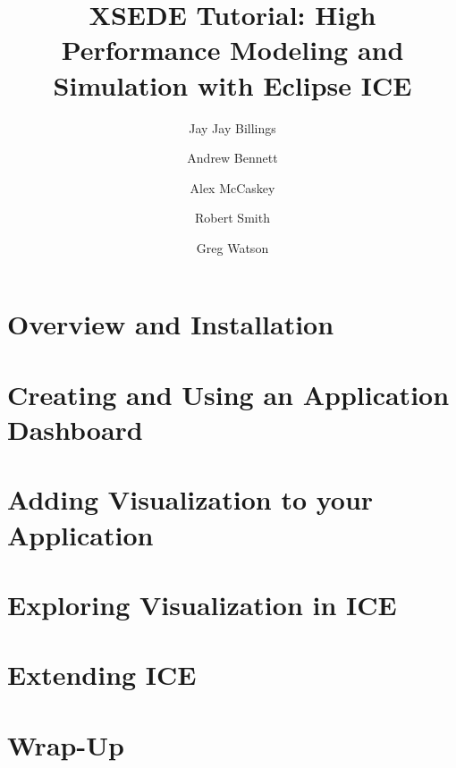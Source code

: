 \documentclass{report}
\begin{document}
\title{XSEDE Tutorial: High Performance Modeling and Simulation with Eclipse ICE}
\author{Jay Jay Billings}
\author{Andrew Bennett}
\author{Alex McCaskey}
\author{Robert Smith}
\author{Greg Watson}

\maketitle{} 

\tableofcontents

\chapter{Overview and Installation}


\graphicspath{{../../installation/src/}}


\chapter{Creating and Using an Application Dashboard}
\graphicspath{{../../newItemGeneration/src/}}



\chapter{Adding Visualization to your Application}
\graphicspath{{../../resourceComponents/src/}}


\chapter{Exploring Visualization in ICE}
\graphicspath{{../../geometryEditor/src/}}


\graphicspath{{../../meshEditor/src/}}


\graphicspath{{../../visualization/src/}}


\chapter{Extending ICE}
\graphicspath{{../../scripting/src/}}
\lstset{inputpath=../../scripting/src/}


\graphicspath{{../../dynamicUI/src/}}


\chapter{Wrap-Up}
\end{document}
